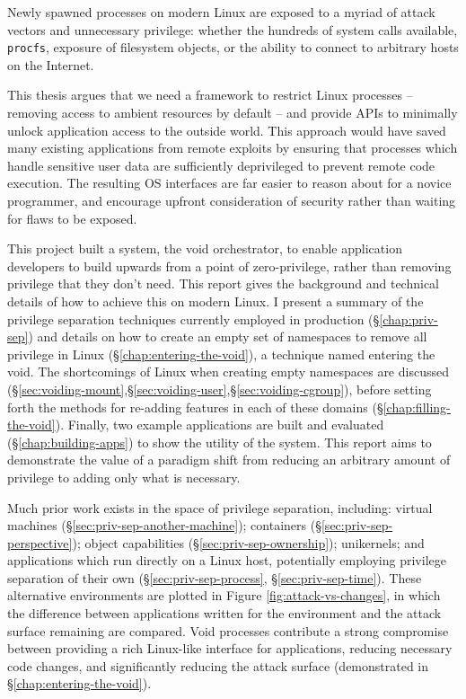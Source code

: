 \documentclass[12pt,a4paper,twoside]{report}
\begin{document}
Newly spawned processes on modern Linux are exposed to a myriad of attack vectors and unnecessary privilege: whether the hundreds of system calls available, \texttt{procfs}, exposure of filesystem objects, or the ability to connect to arbitrary hosts on the Internet.

This thesis argues that we need a framework to restrict Linux processes -- removing access to ambient resources by default -- and provide APIs to minimally unlock application access to the outside world. This approach would have saved many existing applications from remote exploits by ensuring that processes which handle sensitive user data are sufficiently deprivileged to prevent remote code execution.  The resulting OS interfaces are far easier to reason about for a novice programmer, and encourage upfront consideration of security rather than waiting for flaws to be exposed.

This project built a system, the void orchestrator, to enable application developers to build upwards from a point of zero-privilege, rather than removing privilege that they don't need. This report gives the background and technical details of how to achieve this on modern Linux. I present a summary of the privilege separation techniques currently employed in production (§\ref{chap:priv-sep}) and details on how to create an empty set of namespaces to remove all privilege in Linux (§\ref{chap:entering-the-void}), a technique named entering the void. The shortcomings of Linux when creating empty namespaces are discussed (§\ref{sec:voiding-mount},§\ref{sec:voiding-user},§\ref{sec:voiding-cgroup}), before setting forth the methods for re-adding features in each of these domains (§\ref{chap:filling-the-void}). Finally, two example applications are built and evaluated (§\ref{chap:building-apps}) to show the utility of the system. This report aims to demonstrate the value of a paradigm shift from reducing an arbitrary amount of privilege to adding only what is necessary.

Much prior work exists in the space of privilege separation, including: virtual machines (§\ref{sec:priv-sep-another-machine}); containers (§\ref{sec:priv-sep-perspective}); object capabilities (§\ref{sec:priv-sep-ownership}); unikernels; and applications which run directly on a Linux host, potentially employing privilege separation of their own (§\ref{sec:priv-sep-process}, §\ref{sec:priv-sep-time}). These alternative environments are plotted in Figure \ref{fig:attack-vs-changes}, in which the difference between applications written for the environment and the attack surface remaining are compared. Void processes contribute a strong compromise between providing a rich Linux-like interface for applications, reducing necessary code changes, and significantly reducing the attack surface (demonstrated in §\ref{chap:entering-the-void}).
\end{document}
